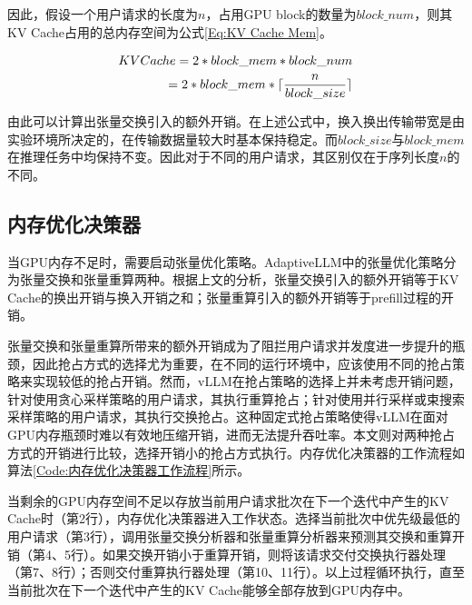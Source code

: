 因此，假设一个用户请求的长度为$n$，占用GPU block的数量为$block\_num$，则其KV Cache占用的总内存空间为公式\ref{Eq:KV Cache Mem}。

\begin{equation}
  \begin{aligned}
    KVCache = 2 * block\_mem * block\_num  \\ =  2 * block\_mem * \lceil \frac{n}{block\_size} \rceil
  \end{aligned}
  \label{Eq:KV Cache Mem}
  \setlength{\abovedisplayskip}{0ex}
  \setlength{\belowdisplayskip}{2ex}
\end{equation}

由此可以计算出张量交换引入的额外开销。在上述公式中，换入换出传输带宽是由实验环境所决定的，在传输数据量较大时基本保持稳定。而$block\_size$与$block\_mem$在推理任务中均保持不变。因此对于不同的用户请求，其区别仅在于序列长度$n$的不同。

\subsection{内存优化决策器}

当GPU内存不足时，需要启动张量优化策略。AdaptiveLLM中的张量优化策略分为张量交换和张量重算两种。根据上文的分析，张量交换引入的额外开销等于KV Cache的换出开销与换入开销之和；张量重算引入的额外开销等于prefill过程的开销。\par

张量交换和张量重算所带来的额外开销成为了阻拦用户请求并发度进一步提升的瓶颈，因此抢占方式的选择尤为重要，在不同的运行环境中，应该使用不同的抢占策略来实现较低的抢占开销。然而，vLLM在抢占策略的选择上并未考虑开销问题，针对使用贪心采样策略的用户请求，其执行重算抢占；针对使用并行采样或束搜索采样策略的用户请求，其执行交换抢占。这种固定式抢占策略使得vLLM在面对GPU内存瓶颈时难以有效地压缩开销，进而无法提升吞吐率。本文则对两种抢占方式的开销进行比较，选择开销小的抢占方式执行。内存优化决策器的工作流程如算法\ref{Code:内存优化决策器工作流程}所示。\par

当剩余的GPU内存空间不足以存放当前用户请求批次在下一个迭代中产生的KV Cache时（第2行），内存优化决策器进入工作状态。选择当前批次中优先级最低的用户请求（第3行），调用张量交换分析器和张量重算分析器来预测其交换和重算开销（第4、5行）。如果交换开销小于重算开销，则将该请求交付交换执行器处理（第7、8行）；否则交付重算执行器处理（第10、11行）。以上过程循环执行，直至当前批次在下一个迭代中产生的KV Cache能够全部存放到GPU内存中。 

